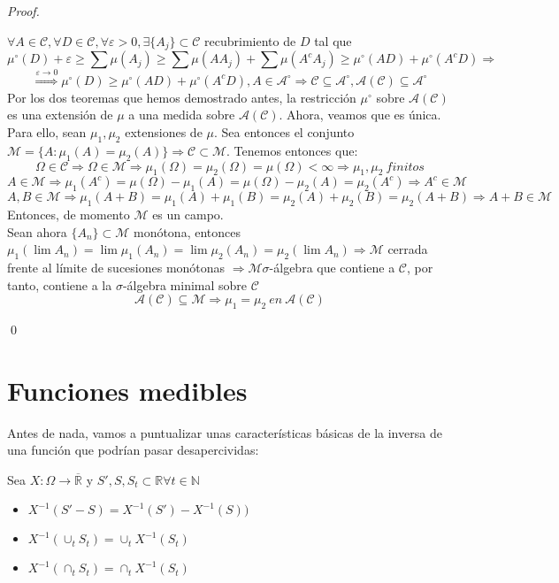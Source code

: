 \begin{proof}
  \

$\forall A \in \mathcal{C}, \forall D \in \mathcal{C}, \forall \varepsilon>0, \exists \{A_j\} \subset \mathcal{C}$ recubrimiento de $D$ tal que
$$\mu^\circ(D) + \varepsilon \geq \sum \mu(A_j) \geq \sum \mu (AA_j) + \sum \mu (A^cA_j) \geq \mu^\circ(AD) + \mu^\circ(A^cD) \Rightarrow$$
$$ \stackrel{\varepsilon \to 0}{\Rightarrow} \mu^\circ(D) \geq \mu^\circ(AD) + \mu^\circ(A^cD), A \in \mathcal{A}^\circ \Rightarrow \mathcal{C} \subseteq \mathcal{A}^\circ, \mathcal{A}(\mathcal{C}) \subseteq \mathcal{A}^\circ $$
Por los dos teoremas que hemos demostrado antes, la restricción $\mu^\circ$ sobre $\mathcal{A}(\mathcal{C})$ es una extensión de $\mu$ a una medida sobre $\mathcal{A}(\mathcal{C})$. Ahora, veamos que es única. Para ello, sean $\mu_1, \mu_2$ extensiones de $\mu$. Sea entonces el conjunto $\mathcal{M} = \{A: \mu_1(A) = \mu_2(A)\} \Rightarrow \mathcal{C} \subset \mathcal{M}$. Tenemos entonces que:
$$ \Omega \in \mathcal{C} \Rightarrow \Omega \in \mathcal{M} \Rightarrow \mu_1(\Omega) = \mu_2(\Omega) = \mu(\Omega) < \infty \Rightarrow \mu_1, \mu_2 \: finitos $$
$$ A \in \mathcal{M} \Rightarrow \mu_1(A^c) = \mu(\Omega) - \mu_1(A) = \mu(\Omega) - \mu_2(A) = \mu_2(A^c) \Rightarrow A^c \in \mathcal{M} $$
$$ A,B \in \mathcal{M} \Rightarrow \mu_1(A+B) = \mu_1(A) + \mu_1(B) = \mu_2(A) + \mu_2(B) = \mu_2(A+B) \Rightarrow A+B \in \mathcal{M}$$
Entonces, de momento $\mathcal{M}$ es un campo.\\

Sean ahora $\{A_n\} \subset \mathcal{M}$ monótona, entonces $\mu_1(\lim A_n) = \lim \mu_1(A_n) = \lim \mu_2(A_n) = \mu_2(\lim A_n) \Rightarrow \mathcal{M}$ cerrada frente al límite de sucesiones monótonas $\Rightarrow \mathcal{M} \sigma$-álgebra que contiene a $\mathcal{C}$, por tanto, contiene a la $\sigma$-álgebra minimal sobre $\mathcal{C}$
$$ \mathcal{A}(\mathcal{C}) \subseteq \mathcal{M} \Rightarrow \mu_1 = \mu_2 \: en \: \mathcal{A}(\mathcal{C})$$

\qed
\end{proof}

\chapter{Funciones medibles}

Antes de nada, vamos a puntualizar unas características básicas de la inversa de una función que podrían pasar desapercividas:

\begin{lemma}
  Sea $X: \Omega \to \overline{\mathbb{R}}$ y $S',S, S_t \subset \mathbb{R} \forall t \in \mathbb{N}$
  \begin{itemize}
    \item $X^{-1}(S'-S)=X^{-1}(S')-X^{-1}(S))$  
    \item $X^{-1}(\cup_t S_t)=\cup_t X^{-1}(S_t)$
    \item $X^{-1}(\cap_t S_t)=\cap_t X^{-1}(S_t)$
  \end{itemize}
\end{lemma}

